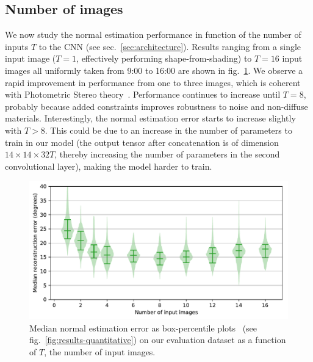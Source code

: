 \subsection{Number of images}
\label{sec:ablation_study}

We now study the normal estimation performance in function of the number of inputs $T$ to the CNN (see sec.~\ref{sec:architecture}). Results ranging from a single input image ($T=1$, effectively performing shape-from-shading) to $T=16$ input images all uniformly taken from 9:00 to 16:00 are shown in fig.~\ref{fig:number_of_inputs}. We observe a rapid improvement in performance from one to three images, which is coherent with Photometric Stereo theory~\cite{woodham-opteng-80}. Performance continues to increase until $T=8$, probably because added constraints improves robustness to noise and non-diffuse materials. Interestingly, the normal estimation error starts to increase slightly with $T > 8$. This could be due to an increase in the number of parameters to train in our model (the output tensor after concatenation is of dimension $14 \times 14 \times 32T$, thereby increasing the number of parameters in the second convolutional layer), making the model harder to train.



\begin{figure}[!t]
\centering
\includegraphics[width=0.75\linewidth]{figures/analysis/input_ablation.pdf}
\caption[Ablation study: surface reconstruction performance in function of the number of input images]{Median normal estimation error as box-percentile plots~\cite{esty-jss-03} (see fig.~\ref{fig:results-quantitative}) on our evaluation dataset as a function of $T$, the number of input images.}
\label{fig:number_of_inputs}
\end{figure}



